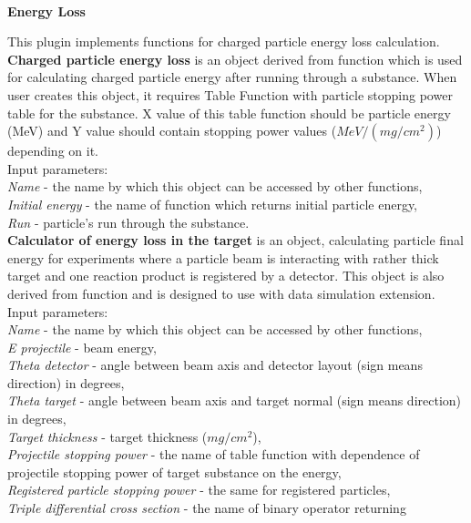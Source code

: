 \documentclass[a4paper]{article}
\begin{document}
\hypertarget{enloss}{\\}
\begin{center}\textbf{Energy Loss}\end{center}
{
This plugin implements functions for charged particle energy loss calculation.\\
\textbf{Charged particle energy loss} is an object derived from {function} which is used for calculating charged particle energy after running through a substance.
When user creates this object, it requires {Table Function} with particle stopping power table for the substance.
X value of this table function should be particle energy (MeV) and Y value should contain stopping power values ($MeV/(mg/cm^2)$) depending on it.\\
Input parameters:\\
\textit{Name} - the name by which this object can be accessed by other {functions},\\
\textit{Initial energy} - the name of {function} which returns initial particle energy,\\
\textit{Run} - particle's run through the substance.\\
\textbf{Calculator of energy loss in the target} is an object, calculating particle final energy for experiments where a particle beam is interacting with rather thick target and one reaction product is registered by a detector.
This object is also derived from {function} and is designed to use with {data simulation} extension.\\
Input parameters:\\
\textit{Name} - the name by which this object can be accessed by other {functions},\\
\textit{E projectile} - beam energy,\\
\textit{Theta detector} - angle between beam axis and detector layout (sign means direction) in degrees,\\
\textit{Theta target} - angle between beam axis and target normal (sign means direction) in degrees,\\
\textit{Target thickness} -  target thickness ($mg/cm^2$),\\
\textit{Projectile stopping power} - the name of {table function} with dependence of projectile stopping power of target substance on the energy,\\
\textit{Registered particle stopping power} - the same for registered particles,\\
\textit{Triple differential cross section} - the name of {binary operator} returning 
}
\end{document}
